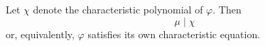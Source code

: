 Let $\chi$ denote the characteristic polynomial of $\varphi$. Then
$$\mu \mid \chi$$
or, equivalently, $\varphi$ satisfies its own characteristic equation.
